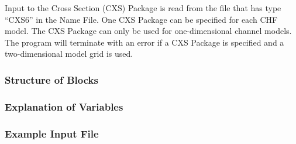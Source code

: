 Input to the Cross Section (CXS) Package is read from the file that has type ``CXS6'' in the Name File.  One CXS Package can be specified for each CHF model. The CXS Package can only be used for one-dimensional channel models.  The program will terminate with an error if a CXS Package is specified and a two-dimensional model grid is used.

\vspace{5mm}
\subsubsection{Structure of Blocks}





\vspace{5mm}
\subsubsection{Explanation of Variables}
\begin{description}

\end{description}

\vspace{5mm}
\subsubsection{Example Input File}


